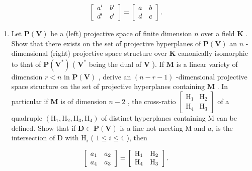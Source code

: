 \[
\left[ \begin{array}{c c} a ^ {\prime} & b ^ {\prime} \\ d ^ {\prime} & c ^ {\prime} \end{array} \right] = \left[ \begin{array}{c c} a & b \\ d & c \end{array} \right].
\]

\begin{enumerate}
\def\labelenumi{\arabic{enumi}.}
\setcounter{enumi}{11}
\tightlist
\item
  Let \(\mathbf{P}(\mathbf{V})\) be a (left) projective space of finite dimension \(n\) over a field \(\mathbf{K}\) . Show that there exists on the set of projective hyperplanes of \(\mathbf{P}(\mathbf{V})\) an \(n\) -dimensional (right) projective space structure over \(\mathbf{K}\) canonically isomorphic to that of \(\mathbf{P}(\mathbf{V}^*)\) ( \(\mathbf{V}^*\) being the dual of \(\mathbf{V}\) ). If \(\mathbf{M}\) is a linear variety of dimension \(r < n\) in \(\mathbf{P}(\mathbf{V})\) , derive an \((n - r - 1)\) -dimensional projective space structure on the set of projective hyperplanes containing \(\mathbf{M}\) . In particular if \(\mathbf{M}\) is of dimension \(n - 2\) , the cross-ratio \(\begin{bmatrix} \mathrm{H}_1 & \mathrm{H}_2 \\ \mathrm{H}_4 & \mathrm{H}_3 \end{bmatrix}\) of a quadruple \((\mathrm{H}_1, \mathrm{H}_2, \mathrm{H}_3, \mathrm{H}_4)\) of distinct hyperplanes containing M can be defined. Show that if \(\mathbf{D} \subset \mathbf{P}(\mathbf{V})\) is a line not meeting M and \(a_i\) is the intersection of D with \(\mathrm{H}_i\) ( \(1 \leqslant i \leqslant 4\) ), then
\end{enumerate}

\[
\left[ \begin{array}{c c} a _ {1} & a _ {2} \\ a _ {4} & a _ {3} \end{array} \right] = \left[ \begin{array}{c c} \mathrm{H} _ {1} & \mathrm{H} _ {2} \\ \mathrm{H} _ {4} & \mathrm{H} _ {3} \end{array} \right].
\]


